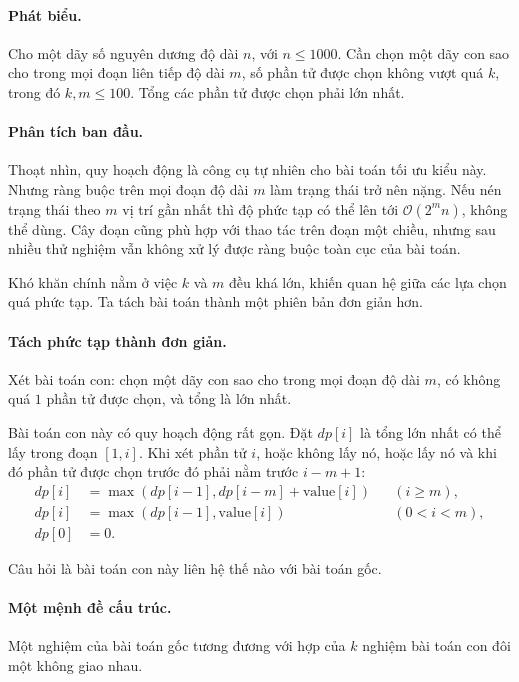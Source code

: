 \documentclass[11pt]{article}
\newcommand{\Oh}{\mathcal{O}}
\begin{document}
\paragraph{Phát biểu.}
Cho một dãy số nguyên dương độ dài \(n\), với \(n\le 1000\). Cần chọn một dãy
con sao cho trong mọi đoạn liên tiếp độ dài \(m\), số phần tử được chọn không
vượt quá \(k\), trong đó \(k,m\le 100\). Tổng các phần tử được chọn phải lớn
nhất.

\paragraph{Phân tích ban đầu.}
Thoạt nhìn, quy hoạch động là công cụ tự nhiên cho bài toán tối ưu kiểu này.
Nhưng ràng buộc trên mọi đoạn độ dài \(m\) làm trạng thái trở nên nặng. Nếu
nén trạng thái theo \(m\) vị trí gần nhất thì độ phức tạp có thể lên tới
\(\Oh(2^m n)\), không thể dùng. Cây đoạn cũng phù hợp với thao tác trên đoạn
một chiều, nhưng sau nhiều thử nghiệm vẫn không xử lý được ràng buộc toàn cục
của bài toán.

Khó khăn chính nằm ở việc \(k\) và \(m\) đều khá lớn, khiến quan hệ giữa các
lựa chọn quá phức tạp. Ta tách bài toán thành một phiên bản đơn giản hơn.

\paragraph{Tách phức tạp thành đơn giản.}
Xét bài toán con: chọn một dãy con sao cho trong mọi đoạn độ dài \(m\), có
không quá \(1\) phần tử được chọn, và tổng là lớn nhất.

Bài toán con này có quy hoạch động rất gọn. Đặt \(dp[i]\) là tổng lớn nhất có
thể lấy trong đoạn \([1,i]\). Khi xét phần tử \(i\), hoặc không lấy nó, hoặc
lấy nó và khi đó phần tử được chọn trước đó phải nằm trước \(i-m+1\):
\[
\begin{aligned}
  dp[i]&=\max(dp[i-1], dp[i-m]+\mathrm{value}[i]) && (i\ge m),\\
  dp[i]&=\max(dp[i-1], \mathrm{value}[i]) && (0<i<m),\\
  dp[0]&=0.
\end{aligned}
\]

Câu hỏi là bài toán con này liên hệ thế nào với bài toán gốc.

\paragraph{Một mệnh đề cấu trúc.}
Một nghiệm của bài toán gốc tương đương với hợp của \(k\) nghiệm bài toán con
đôi một không giao nhau.
\end{document}
